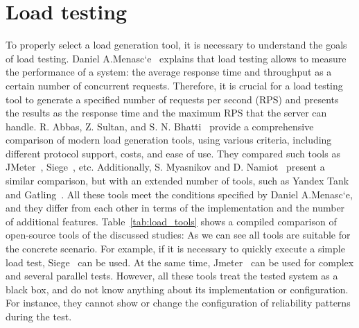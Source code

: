 \section{Load testing}\label{sec:load_generation}
To properly select a load generation tool, it is necessary to understand the goals of load testing. Daniel A.Menasc`e~\cite{load_testing_base} explains that load testing allows to measure the performance of a system: the average response time and throughput as a certain number of concurrent requests. Therefore, it is crucial for a load testing tool to generate a specified number of requests per second (RPS) and presents the results as the response time and the maximum RPS that the server can handle.
R. Abbas, Z. Sultan, and S. N. Bhatti~\cite{load_testing_tools} provide a comprehensive comparison of modern load generation tools, using various criteria, including different protocol support, costs, and ease of use. They compared such tools as JMeter~\cite{jmeter}, Siege~\cite{siege}, etc. Additionally, S. Myasnikov and D. Namiot~\cite{load_testing_tools_rus} present a similar comparison, but with an extended number of tools, such as Yandex Tank~\cite{yandex_tank} and Gatling~\cite{gatling}. All these tools meet the conditions specified by Daniel A.Menasc`e, and they differ from each other in terms of the implementation and the number of additional features. Table~\ref{tab:load_tools} shows a compiled comparison of open-source tools of the discussed studies:
As we can see all tools are suitable for the concrete scenario. For example, if it is necessary to quickly execute a simple load test, Siege~\cite{siege} can be used. At the same time, Jmeter~\cite{jmeter} can be used for complex and several parallel tests. However, all these tools treat the tested system as a black box, and do not know anything about its implementation or configuration. For instance, they cannot show or change the configuration of reliability patterns during the test.

